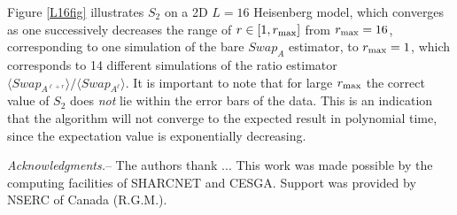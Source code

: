 \documentclass[prl,aps,twocolumn,floatfix,amsmath,amssymb,superscriptaddress,tightenlines]{revtex4}
\begin{document}
Figure \ref{L16fig} illustrates $S_2$ on a 2D $L=16$ Heisenberg model, which converges as one successively decreases the range of $r \in [1,r_{\rm max}]$ from $r_{\rm max}=16$, corresponding to one simulation of the bare $Swap_A$ estimator, to $r_{\rm max}=1$, which corresponds to 14 different simulations of the ratio estimator ${\langle Swap_{A^{\ell+r}}\rangle}/{\langle Swap_{A^{\ell}}\rangle}$.  It is important to note that for large $r_{\rm max}$ the correct value of $S_2$ does {\it not} lie within the error bars of the data.  This is an indication that the algorithm will not converge to the expected result in polynomial time, since the expectation value is exponentially decreasing.






{\it Acknowledgments.}-- The authors thank ...
This work was made possible by the
computing facilities of SHARCNET and CESGA.  Support was provided by NSERC
of Canada (R.G.M.).


\end{document}
